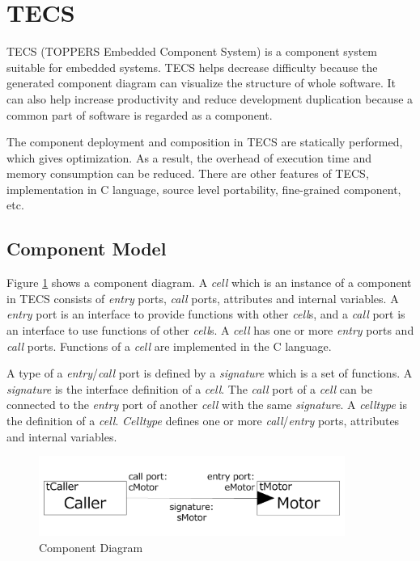 \documentclass[a4j,12pt,oneside,openany,english]{jsbook}
\begin{document}
\section{TECS}
\label{sec:TECS}
TECS (TOPPERS Embedded Component System) is a component system suitable for embedded systems.
TECS helps decrease difficulty because the generated component diagram can visualize the structure of whole software.
It can also help increase productivity and reduce development duplication because a common part of software is regarded as a component.

The component deployment and composition in TECS are statically performed, which gives optimization.
As a result, the overhead of execution time and memory consumption can be reduced.
There are other features of TECS, implementation in C language, source level portability, fine-grained component, etc.

\subsection{Component Model}

Figure \ref{fig:component} shows a component diagram.
A {\it cell} which is an instance of a component in TECS consists of {\it entry} ports, {\it call} ports, attributes and internal variables.
A {\it entry} port is an interface to provide functions with other {\it cell}s, and a {\it call} port is an interface to use functions of other {\it cell}s.
A {\it cell} has one or more {\it entry} ports and {\it call} ports.
Functions of a {\it cell} are implemented in the C language.

A type of a {\it entry}/{\it call} port is defined by a {\it signature} which is a set of functions.
A {\it signature} is the interface definition of a {\it cell}.
The {\it call} port of a {\it cell} can be connected to the {\it entry} port of another {\it cell} with the same {\it signature}.
A {\it celltype} is the definition of a {\it cell}.
{\it Celltype} defines one or more {\it call}/{\it entry} ports, attributes and internal variables.

\begin{figure}[t]
    \centering
    \includegraphics[width=10cm,clip]{../EMSOFT2016/figure/component_diagram.pdf}
    \caption{Component Diagram}
    \label{fig:component}
\end{figure}
\end{document}
